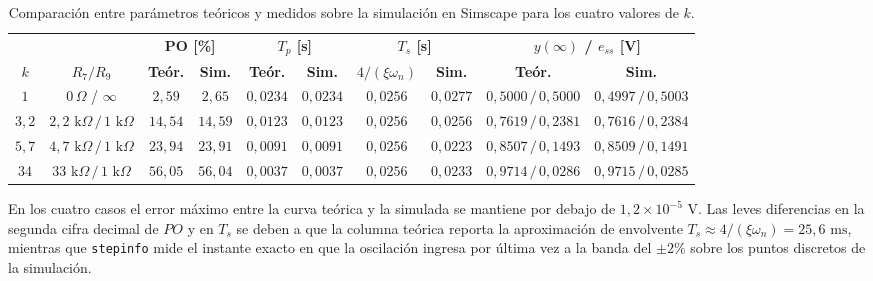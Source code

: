 \documentclass[11pt,a4paper]{article}
\begin{document}
\begin{table}[H]
    \centering
    \small
    \begin{tabular}{c c c c c c c c c c}
        \toprule
        & & \multicolumn{2}{c}{\textbf{PO [\%]}} & \multicolumn{2}{c}{\textbf{$T_p$ [s]}} & \multicolumn{2}{c}{\textbf{$T_s$ [s]}} & \multicolumn{2}{c}{\textbf{$y(\infty)$ / $e_{ss}$ [V]}} \\
        \cmidrule(lr){3-4} \cmidrule(lr){5-6} \cmidrule(lr){7-8} \cmidrule(lr){9-10}
        \textbf{$k$} & \textbf{$R_7 / R_9$} & \textbf{Teór.} & \textbf{Sim.} & \textbf{Teór.} & \textbf{Sim.} & \textbf{$4/(\xi\omega_n)$} & \textbf{Sim.} & \textbf{Teór.} & \textbf{Sim.} \\
        \midrule
        $1$   & $0\,\Omega$ / $\infty$            & $2,59$  & $2,65$  & $0,0234$ & $0,0234$ & $0,0256$ & $0,0277$ & $0,5000\,/\,0,5000$ & $0,4997\,/\,0,5003$ \\
        $3,2$ & $2,2\text{ k}\Omega\,/\,1\text{ k}\Omega$ & $14,54$ & $14,59$ & $0,0123$ & $0,0123$ & $0,0256$ & $0,0256$ & $0,7619\,/\,0,2381$ & $0,7616\,/\,0,2384$ \\
        $5,7$ & $4,7\text{ k}\Omega\,/\,1\text{ k}\Omega$ & $23,94$ & $23,91$ & $0,0091$ & $0,0091$ & $0,0256$ & $0,0223$ & $0,8507\,/\,0,1493$ & $0,8509\,/\,0,1491$ \\
        $34$  & $33\text{ k}\Omega\,/\,1\text{ k}\Omega$  & $56,05$ & $56,04$ & $0,0037$ & $0,0037$ & $0,0256$ & $0,0233$ & $0,9714\,/\,0,0286$ & $0,9715\,/\,0,0285$ \\
        \bottomrule
    \end{tabular}
    \caption{Comparación entre parámetros teóricos y medidos sobre la simulación en Simscape para los cuatro valores de $k$.}
    \label{tab:punto5d}
\end{table}

En los cuatro casos el error máximo entre la curva teórica y la simulada se mantiene por debajo de $1,2 \times 10^{-5}\text{ V}$. Las leves diferencias en la segunda cifra decimal de $PO$ y en $T_s$ se deben a que la columna teórica reporta la aproximación de envolvente $T_s \approx 4/(\xi\omega_n) = 25,6\text{ ms}$, mientras que \texttt{stepinfo} mide el instante exacto en que la oscilación ingresa por última vez a la banda del $\pm 2\%$ sobre los puntos discretos de la simulación.
\end{document}
